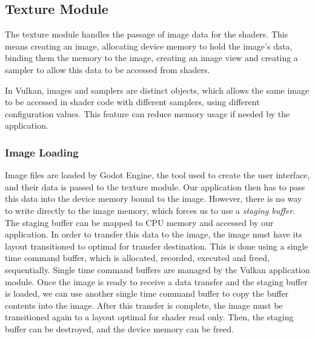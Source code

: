 \subsection{Texture Module}
The texture module handles the passage of image data for the shaders. This means creating an image, allocating device memory to hold the image's data, binding them the memory to the image, creating an image view and creating a sampler to allow this data to be accessed from shaders.

In Vulkan, images and samplers are distinct objects, which allows the same image to be accessed in shader code with different samplers, using different configuration values. This feature can reduce memory usage if needed by the application.

\subsubsection{Image Loading}
Image files are loaded by Godot Engine, the tool used to create the user interface, and their data is passed to the texture module. Our application then has to pass this data into the device memory bound to the image. However, there is no way to write directly to the image memory, which forces us to use a \textit{staging buffer}. The staging buffer can be mapped to CPU memory and accessed by our application. In order to transfer this data to the image, the image must have its layout transitioned to optimal for transfer destination. This is done using a single time command buffer, which is allocated, recorded, executed and freed, sequentially. Single time command buffers are managed by the Vulkan application module. Once the image is ready to receive a data transfer and the staging buffer is loaded, we can use another single time command buffer to copy the buffer contents into the image. After this transfer is complete, the image must be transitioned again to a layout optimal for shader read only. Then, the staging buffer can be destroyed, and the device memory can be freed.
